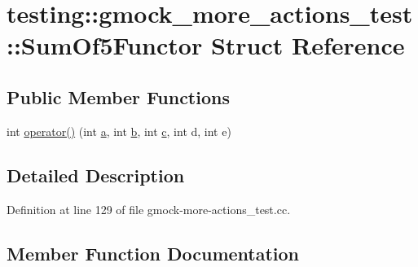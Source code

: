 \hypertarget{structtesting_1_1gmock__more__actions__test_1_1_sum_of5_functor}{}\section{testing\+:\+:gmock\+\_\+more\+\_\+actions\+\_\+test\+:\+:Sum\+Of5\+Functor Struct Reference}
\label{structtesting_1_1gmock__more__actions__test_1_1_sum_of5_functor}
\subsection*{Public Member Functions}
\begin{DoxyCompactItemize}
\item 
int \hyperlink{structtesting_1_1gmock__more__actions__test_1_1_sum_of5_functor_ab7c80522ca7401c89e86eecb03fe1fbb}{operator()} (int \hyperlink{_07copy_08_2_read_camera_model_8m_a551a3d351eadcc0b9b1a2f24f0fb5ea0}{a}, int \hyperlink{jquery_8js_a2fa551895933fae935a0a6b87282241d}{b}, int \hyperlink{jquery_8js_abce695e0af988ece0826d9ad59b8160d}{c}, int d, int e)
\end{DoxyCompactItemize}


\subsection{Detailed Description}


Definition at line 129 of file gmock-\/more-\/actions\+\_\+test.\+cc.



\subsection{Member Function Documentation}
